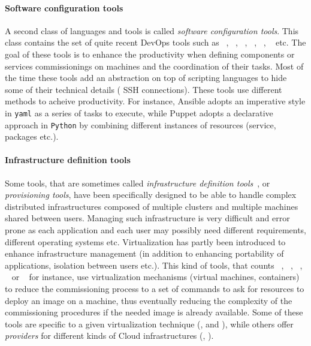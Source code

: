 \paragraph{Software configuration tools}
A second class of languages and tools is called \emph{software
  configuration tools}. This class contains the set of quite recent
DevOps tools such as \ansible~\cite{}, \deployware~\cite{},
\puppet~\cite{}, \chef~\cite{}, \salt~\cite{}, \aeolus~\cite{} etc. The
goal of these tools is to enhance the productivity when defining
components or services commissionings on machines and the coordination
of their tasks. Most of the time these tools add an abstraction on top
of scripting languages to hide some of their technical details (\eg
SSH connections). These tools use different methods to acheive
productivity. For instance, Ansible adopts an imperative style in
\texttt{yaml} as a series of tasks to execute, while Puppet adopts a
declarative approach in \texttt{Python} by combining different
instances of resources (\ie service, packages etc.).

\paragraph{Infrastructure definition tools}
Some tools, that are sometimes called \emph{infrastructure definition
  tools}~\cite{}, or \emph{provisioning tools}, have been specifically
designed to be able to handle complex distributed infrastructures
composed of multiple clusters and multiple machines shared between
users. Managing such infrastructure is very difficult and error prone
as each application and each user may possibly need different
requirements, different operating systems etc. Virtualization has
partly been introduced to enhance infrastructure management (in
addition to enhancing portability of applications, isolation between
users etc.). This kind of tools, that counts \docker~\cite{},
\terraform~\cite{}, \juju~\cite{}, \cloudformation~\cite{} or
\heat~\cite{} for instance, use virtualization mechanisms (\eg virtual
machines, containers) to reduce the commissioning process to a set of
commands to ask for resources to deploy an image on a machine, thus
eventually reducing the complexity of the commissioning procedures if
the needed image is already available. Some of these tools are
specific to a given virtualization technique (\eg \docker,
\cloudformation and \heat), while others offer \emph{providers} for
different kinds of Cloud infrastructures (\eg \terraform, \juju).

